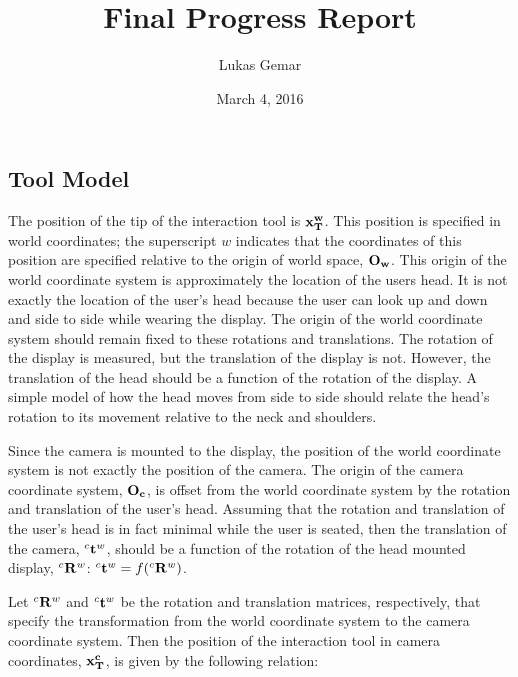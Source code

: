 \documentclass{article}
\newcommand{\xwT}{\bf{x}{^w_T}} %
\newcommand{\xcT}{\bf{x}{^c_T}} %
\newcommand{\R}[2]{{^#1}{\bf{R}}{^#2}}
\newcommand{\T}[2]{{^#1}{\bf{t}}{^#2}}
\begin{document}
\title{Final Progress Report}
\author{Lukas Gemar}
\date{March 4, 2016}
\maketitle

\begin{flushleft}

\section{Tool Model}

\medskip

The position of the tip of the interaction tool is $ \xwT $. This position is specified in world coordinates; the superscript $w$ indicates that the coordinates of this position are specified relative to the origin of world space, $\bf{O_w}$. This origin of the world coordinate system is approximately the location of the users head. It is not exactly the location of the user's head because the user can look up and down and side to side while wearing the display. The origin of the world coordinate system should remain fixed to these rotations and translations. The rotation of the display is measured, but the translation of the display is not. However, the translation of the head should be a function of the rotation of the display. A simple model of how the head moves from side to side should relate the head's rotation to its movement relative to the neck and shoulders.

\medskip

Since the camera is mounted to the display, the position of the world coordinate system is not exactly the position of the camera. The origin of the camera coordinate system, $\bf{O_c}$, is offset from the world coordinate system by the rotation and translation of the user's head. Assuming that the rotation and translation of the user's head is in fact minimal while the user is seated, then the translation of the camera, $\T{c}{w}$, should be a function of the rotation of the head mounted display, $\R{c}{w}$: $\T{c}{w} = f(\R{c}{w})$. 

\medskip

Let $\R{c}{w}$ and $\T{c}{w}$ be the rotation and translation matrices, respectively, that specify the transformation from the world coordinate system to the camera coordinate system. Then the position of the interaction tool in camera coordinates, $ \xcT $,  is given by the following relation: 


\end{flushleft}
\end{document}
